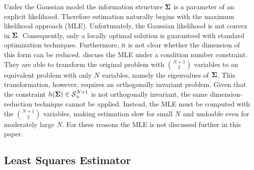 \documentclass[11pt]{article}
\theoremstyle{definition}
\theoremstyle{definition}
\def\bSigma{{\bf \Sigma}}
\begin{document}
Under the Gaussian model the information structure $\bSigma$ is a parameter of an explicit likelihood. Therefore estimation naturally begins with the maximum likelihood approach (MLE).  Unfortunately, the Gaussian likelihood is not convex in $\bSigma$. Consequently, only a locally optimal solution is guaranteed with standard optimization techniques. 
Furthermore, it is not clear whether the dimension of this form can be reduced. \cite{won2006maximum} discuss the MLE under a condition number constraint. They are able to transform the original problem with $\binom{N+1}{2}$ variables to an equivalent problem with only $N$ variables, namely the eigenvalues of $\bSigma$. This transformation, however, requires an orthogonally invariant problem. Given that the constraint $h(\bSigma) \in \mathcal{S}_{+}^{N+1}$ is not orthogonally invariant, the same dimension-reduction technique cannot be applied. Instead, the MLE must be computed with the $\binom{N+1}{2}$ variables, making estimation slow for small $N$ and undoable even for moderately large $N$. For these reasons the MLE is not discussed further in this paper.

\subsection{Least Squares Estimator}
\label{lse}



\end{document}
